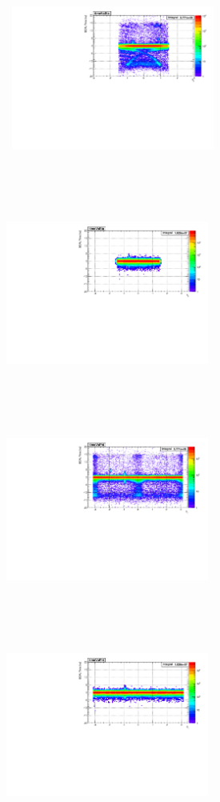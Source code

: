 \begin{center}
\centering
\mbox{
\includegraphics[height=7cm, width=0.5\textwidth]{THESISPLOTS/SinglePhotonDataSet-TimeVsEtaEB.pdf}
\includegraphics[height=7cm, width=0.5\textwidth]
{THESISPLOTS/ZCandidates_TimeVsEta.pdf}}
\mbox{
\includegraphics[height=7cm, width=0.5\textwidth]{THESISPLOTS/SinglePhotonDataSet-TimeVsPhiEB.pdf}
\includegraphics[height=7cm, width=0.5\textwidth]{THESISPLOTS/ZCandidates_TimeVsPhi.pdf}}

\end{center}
